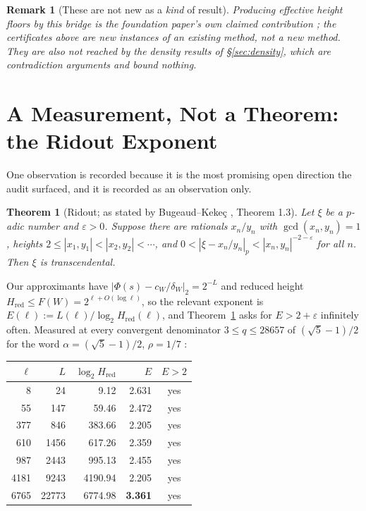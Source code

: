 \documentclass[11pt]{article}
\newtheorem{theorem}{Theorem}[section]
\newtheorem*{remark}{Remark}
\newcommand{\cw}{c_W}
\begin{document}
\begin{remark}[These are not new as a \emph{kind} of result]
Producing effective height floors by this bridge is the foundation paper's own claimed contribution
\cite{DeJesus2026Sturmian}; the certificates above are new instances of an existing method, not a new
method. They are also not reached by the density results of \S\ref{sec:density}, which are
contradiction arguments and bound nothing.
\end{remark}

\section{A Measurement, Not a Theorem: the Ridout Exponent}
\label{sec:ridout}

One observation is recorded because it is the most promising open direction the audit surfaced, and
it is recorded as an observation only.

\begin{theorem}[Ridout; as stated by Bugeaud--Keke\c{c} \cite{BugeaudKekec}, Theorem 1.3]
\label{thm:ridout}
Let $\xi$ be a $p$-adic number and $\varepsilon>0$. Suppose there are rationals $x_n/y_n$ with
$\gcd(x_n,y_n)=1$, heights $2\le|x_1,y_1|<|x_2,y_2|<\cdots$, and
$0<|\xi-x_n/y_n|_p<|x_n,y_n|^{-2-\varepsilon}$ for all $n$. Then $\xi$ is transcendental.
\end{theorem}

Our approximants have $|\Phi(s)-\cw/\delta_W|_2=2^{-L}$ and reduced height $H_{\mathrm{red}}\le
F(W)=2^{\ell+O(\log\ell)}$, so the relevant exponent is
$E(\ell):=L(\ell)/\log_2H_{\mathrm{red}}(\ell)$, and Theorem~\ref{thm:ridout} asks for
$E>2+\varepsilon$ infinitely often. Measured at every convergent denominator
$3\le q\le28657$ of $(\sqrt5-1)/2$ for the word $\alpha=(\sqrt5-1)/2$, $\rho=1/7$
\cite{Phase13Ridout}:

\begin{center}
\begin{tabular}{@{}rrrrc@{}}
\toprule
$\ell$ & $L$ & $\log_2H_{\mathrm{red}}$ & $E$ & $E>2$ \\
\midrule
8 & 24 & 9.12 & 2.631 & yes \\
55 & 147 & 59.46 & 2.472 & yes \\
377 & 846 & 383.66 & 2.205 & yes \\
610 & 1456 & 617.26 & 2.359 & yes \\
987 & 2443 & 995.13 & 2.455 & yes \\
4181 & 9243 & 4190.94 & 2.205 & yes \\
6765 & 22773 & 6774.98 & \textbf{3.361} & yes \\
\bottomrule
\end{tabular}
\end{center}
\end{document}
